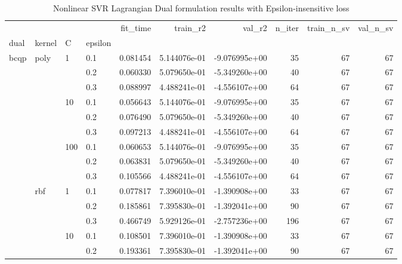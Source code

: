 \begin{table}[h!]
\centering
\caption{Nonlinear SVR Lagrangian Dual formulation results with Epsilon-insensitive loss}
\label{nonlinear_lagrangian_dual_svr_cv_results}
\begin{tabular}{llllrrrrrr}
\toprule
   &     &     &     &  fit\_time &      train\_r2 &        val\_r2 &  n\_iter &  train\_n\_sv &  val\_n\_sv \\
dual & kernel & C & epsilon &           &               &               &         &             &           \\
\midrule
bcqp & poly & 1   & 0.1 &  0.081454 &  5.144076e-01 & -9.076995e+00 &      35 &          67 &        67 \\
   &     &     & 0.2 &  0.060330 &  5.079650e-01 & -5.349260e+00 &      40 &          67 &        67 \\
   &     &     & 0.3 &  0.088997 &  4.488241e-01 & -4.556107e+00 &      64 &          67 &        67 \\
   &     & 10  & 0.1 &  0.056643 &  5.144076e-01 & -9.076995e+00 &      35 &          67 &        67 \\
   &     &     & 0.2 &  0.076490 &  5.079650e-01 & -5.349260e+00 &      40 &          67 &        67 \\
   &     &     & 0.3 &  0.097213 &  4.488241e-01 & -4.556107e+00 &      64 &          67 &        67 \\
   &     & 100 & 0.1 &  0.060653 &  5.144076e-01 & -9.076995e+00 &      35 &          67 &        67 \\
   &     &     & 0.2 &  0.063831 &  5.079650e-01 & -5.349260e+00 &      40 &          67 &        67 \\
   &     &     & 0.3 &  0.105566 &  4.488241e-01 & -4.556107e+00 &      64 &          67 &        67 \\
   & rbf & 1   & 0.1 &  0.077817 &  7.396010e-01 & -1.390908e+00 &      33 &          67 &        67 \\
   &     &     & 0.2 &  0.185861 &  7.395830e-01 & -1.392041e+00 &      90 &          67 &        67 \\
   &     &     & 0.3 &  0.466749 &  5.929126e-01 & -2.757236e+00 &     196 &          67 &        67 \\
   &     & 10  & 0.1 &  0.108501 &  7.396010e-01 & -1.390908e+00 &      33 &          67 &        67 \\
   &     &     & 0.2 &  0.193361 &  7.395830e-01 & -1.392041e+00 &      90 &          67 &        67 \\

\end{tabular}
\end{table}
